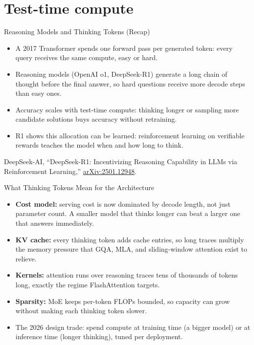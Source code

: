 \section{Test-time compute}

\begin{frame}{Reasoning Models and Thinking Tokens (Recap)}
  \begin{itemize}
    \item[$\blacktriangleright$] A 2017 Transformer spends one forward pass per generated token: every query receives the same compute, easy or hard.
    \item[$\blacktriangleright$] Reasoning models (OpenAI o1, DeepSeek-R1) generate a long chain of thought before the final answer, so hard questions receive more decode steps than easy ones.
    \item[$\blacktriangleright$] Accuracy scales with test-time compute: thinking longer or sampling more candidate solutions buys accuracy without retraining.
    \item[$\blacktriangleright$] R1 shows this allocation can be learned: reinforcement learning on verifiable rewards teaches the model when and how long to think.
  \end{itemize}
  \vfill
  {\scriptsize DeepSeek-AI, ``DeepSeek-R1: Incentivizing Reasoning Capability in LLMs via Reinforcement Learning,'' \href{https://arxiv.org/abs/2501.12948}{arXiv:2501.12948}.}
\end{frame}

\begin{frame}{What Thinking Tokens Mean for the Architecture}
  \begin{itemize}
    \item[$\blacktriangleright$] \textbf{Cost model:} serving cost is now dominated by decode length, not just parameter count. A smaller model that thinks longer can beat a larger one that answers immediately.
    \item[$\blacktriangleright$] \textbf{KV cache:} every thinking token adds cache entries, so long traces multiply the memory pressure that GQA, MLA, and sliding-window attention exist to relieve.
    \item[$\blacktriangleright$] \textbf{Kernels:} attention runs over reasoning traces tens of thousands of tokens long, exactly the regime FlashAttention targets.
    \item[$\blacktriangleright$] \textbf{Sparsity:} MoE keeps per-token FLOPs bounded, so capacity can grow without making each thinking token slower.
    \item[$\blacktriangleright$] The 2026 design trade: spend compute at training time (a bigger model) or at inference time (longer thinking), tuned per deployment.
  \end{itemize}
\end{frame}
